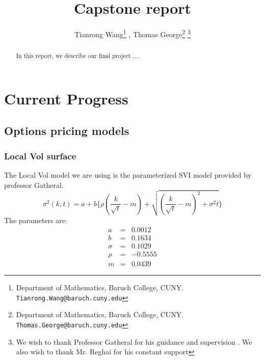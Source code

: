 \documentclass[12pt]{article}
\numberwithin{equation}{section}
\begin{document}
\title{\bf Capstone report}

\author{Tianrong Wang\footnote{Department of Mathematics, Baruch College, CUNY. {\tt  Tianrong.Wang@baruch.cuny.edu}}{\setcounter{footnote}{1}} , Thomas George\footnote{Department of Mathematics, Baruch College, CUNY. {\tt  Thomas.George@baruch.cuny.edu}}{\setcounter{footnote}{2}} \thanks{We wish to thank Professor Gatheral for his guidance and supervision . We also wish to thank Mr. Reghai for his constant support}
}



\maketitle\thispagestyle{empty}
 



\begin{abstract}
In this report, we describe our final project ....
\end{abstract}

%
%
%
%

\section{Current Progress}
\subsection{Options pricing models}
\subsubsection{Local Vol surface}
The Local Vol model we are using is the parameterized SVI model provided by professor Gatheral.
\[
    \sigma^2(k,t)=a+b\{\rho (\frac{k}{\sqrt{t}}-m)+\sqrt{(\frac{k}{\sqrt{t}}-m)^2+\sigma^2 t}\}
\]
The parameters are:
\begin{eqnarray*} 
    a&=&0.0012\\
    b&=&0.1634\\
    \sigma&=&0.1029\\
    \rho&=&-0.5555\\
    m&=&0.0439
\end{eqnarray*} 
\end{document}
